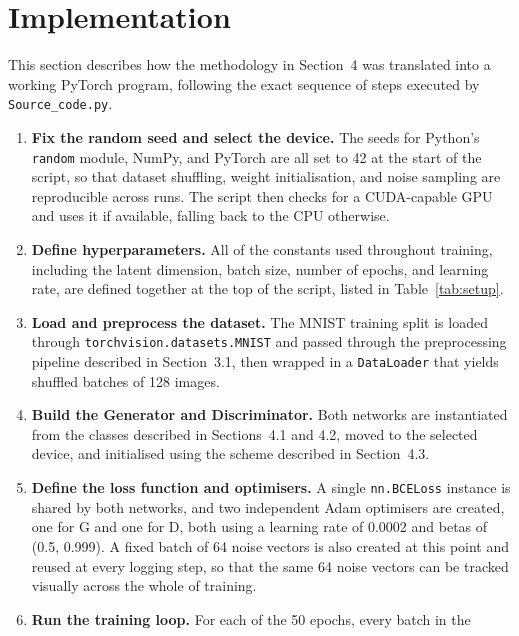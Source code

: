 \documentclass[12pt,a4paper]{article}
\begin{document}
\section{Implementation}

This section describes how the methodology in Section~4 was translated into a working
PyTorch program, following the exact sequence of steps executed by \texttt{Source\_code.py}.

\begin{enumerate}
    \item \textbf{Fix the random seed and select the device.} The seeds for Python's
          \texttt{random} module, NumPy, and PyTorch are all set to 42 at the start of
          the script, so that dataset shuffling, weight initialisation, and noise
          sampling are reproducible across runs. The script then checks for a CUDA-capable
          GPU and uses it if available, falling back to the CPU otherwise.
    \item \textbf{Define hyperparameters.} All of the constants used throughout training,
          including the latent dimension, batch size, number of epochs, and learning
          rate, are defined together at the top of the script, listed in
          Table~\ref{tab:setup}.
    \item \textbf{Load and preprocess the dataset.} The MNIST training split is loaded
          through \texttt{torchvision.datasets.MNIST} and passed through the
          preprocessing pipeline described in Section~3.1, then wrapped in a
          \texttt{DataLoader} that yields shuffled batches of 128 images.
    \item \textbf{Build the Generator and Discriminator.} Both networks are instantiated
          from the classes described in Sections~4.1 and 4.2, moved to the selected
          device, and initialised using the scheme described in Section~4.3.
    \item \textbf{Define the loss function and optimisers.} A single
          \texttt{nn.BCELoss} instance is shared by both networks, and two independent
          Adam optimisers are created, one for G and one for D, both using a learning
          rate of 0.0002 and betas of (0.5, 0.999). A fixed batch of 64 noise vectors is
          also created at this point and reused at every logging step, so that the same
          64 noise vectors can be tracked visually across the whole of training.
    \item \textbf{Run the training loop.} For each of the 50 epochs, every batch in the

\end{enumerate}
\end{document}
